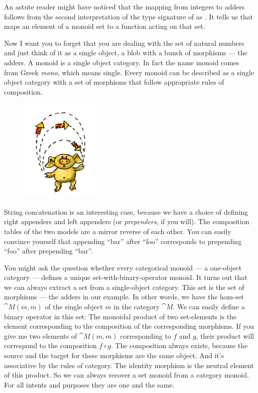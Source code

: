 An astute reader might have noticed that the mapping from integers to
adders follows from the second interpretation of the type signature of
 as . It
tells us that  maps an element of a monoid set to a
function acting on that set.

Now I want you to forget that you are dealing with the set of natural
numbers and just think of it as a single object, a blob with a bunch of
morphisms --- the adders. A monoid is a single object category. In fact
the name monoid comes from Greek \emph{mono}, which means single. Every
monoid can be described as a single object category with a set of
morphisms that follow appropriate rules of composition.

\begin{figure}[H]
  \centering
  \includegraphics[width=0.35\textwidth]{images/monoid.jpg}
\end{figure}

\noindent
String concatenation is an interesting case, because we have a choice of
defining right appenders and left appenders (or \emph{prependers}, if
you will). The composition tables of the two models are a mirror reverse
of each other. You can easily convince yourself that appending ``bar''
after ``foo'' corresponds to prepending ``foo'' after prepending
``bar''.

You might ask the question whether every categorical monoid --- a
one-object category --- defines a unique set-with-binary-operator
monoid. It turns out that we can always extract a set from a
single-object category. This set is the set of morphisms --- the adders
in our example. In other words, we have the hom-set $\cat{M}(m, m)$ of the
single object $m$ in the category $\cat{M}$. We can easily define a binary
operator in this set: The monoidal product of two set-elements is the
element corresponding to the composition of the corresponding morphisms.
If you give me two elements of $\cat{M}(m, m)$ corresponding to $f$ and
$g$, their product will correspond to the composition
$f \circ g$. The composition always exists, because the source and the
target for these morphisms are the same object. And it's associative by
the rules of category. The identity morphism is the neutral element of
this product. So we can always recover a set monoid from a category
monoid. For all intents and purposes they are one and the same.

